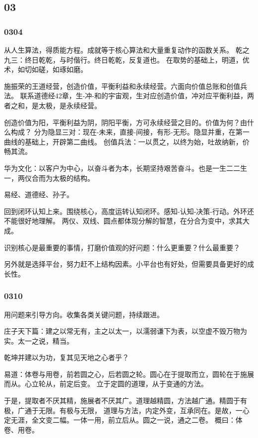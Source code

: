 \subsection{03}

\subsubsection{0304}

从人生算法，得质能方程。成就等于核心算法和大量重复动作的函数关系。
乾之九三：终日乾乾，与时偕行。终日乾乾，反复道也。
在取势的基础上，明道，优术，如切如磋，如琢如磨。

施振荣的王道经营，创造价值，平衡利益和永续经营。六面向价值总账和创值兵法。
联系道德经42章，生-冲-和的宇宙观，生对应创造价值，冲对应平衡利益，两者之和，是太极，是永续经营。

创造价值为阳，平衡利益为阴，阴阳平衡，方可永续经营之目的。价值为何？由什么构成？
分为隐显三对：现在-未来，直接-间接，有形-无形。隐显并重，在第一曲线的基础上，开辟第二曲线。
创值兵法：一以贯之，以终为始，吐故纳新，价畅其流。

华为文化：以客户为中心，以奋斗者为本，长期坚持艰苦奋斗。也是一生二二生一，两仪合而为太极的结构。

易经、道德经、孙子。

回到闭环认知上来。围绕核心，高度运转认知闭环。感知-认知-决策-行动。外环还不能很好地理解。
两仪、双线、圆点都体现分解的智慧，在分合为变中，求其大成。

识别核心是最重要的事情，打磨价值观的好问题：什么更重要？什么最重要？

另外就是选择平台，努力赶不上结构因素。小平台也有好处，但需要具备更好的成长性。


\subsubsection{0310}

用问题来引导方向。收集各类关键问题，持续跟进。

庄子天下篇：建之以常无有，主之以太一，以濡弱谦下为表，以空虚不毁万物为实。太一之说，精当。

乾坤并建以为功，复其见天地之心者乎？

易道：体卷与用卷，前若圆之心，后若圆之轮。圆心在于提取而立，圆轮在于施展而从。心立轮从，前定后变。
立于定圆的道理，从于变通的方法。

于是，提取者不厌其精，施展者不厌其广。道理越精圆，方法越广通。精圆于有极，广通于无限。有极与无限，
道理与方法，内定外变，互承同在。是故，一心定无涯，全文变二幅。一体一用，前立后从。圆之一说，通之二卷。
概曰：体卷、用卷。


